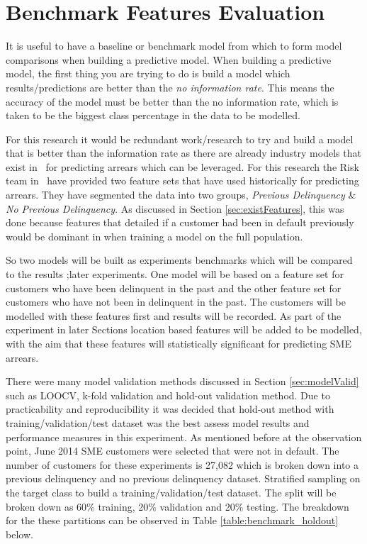 \section{Benchmark Features Evaluation}
It is useful to have a baseline or benchmark model from which to form model comparisons when building a predictive model. When building a predictive model, the first thing you are trying to do is build a model which results/predictions are better than the \textit{no information rate}. This means the accuracy of the model must be better than the no information rate, which is taken to be the biggest class percentage in the data to be modelled. 

For this research it would be redundant work/research to try and build a model that is better than the information rate as there are already industry models that exist in \subjectname\ for predicting arrears which can be leveraged. For this research the Risk team in \subjectname\ have provided two feature sets that have used historically for predicting arrears. They have segmented the data into two groups, \textit{Previous Delinquency} \& \textit{No Previous Delinquency}. As discussed in Section \ref{sec:existFeatures}, this was done because features that detailed if a customer had been in default previously would be dominant in when training a model on the full population.

So two models will be built as experiments benchmarks which will be compared to the results ;later experiments. One model will be based on a feature set for customers who have been delinquent in the past and the other feature set for customers who have not been in delinquent in the past. The customers will be modelled with these features first and results will be recorded. As part of the experiment in later Sections location based features will be added to be modelled, with the aim that these features will statistically significant for predicting SME arrears. 



There were many model validation methods discussed in Section \ref{sec:modelValid} such as LOOCV, k-fold validation and hold-out validation method. Due to practicability and reproducibility it was decided that hold-out method with training/validation/test dataset was the best assess model results and performance measures in this experiment. As mentioned before at the observation point, June 2014 SME customers were selected that were not in default. The number of customers for these experiments is 27,082 which is broken down into a previous delinquency and no previous delinquency dataset. Stratified sampling on the target class to build a training/validation/test dataset. The split will be broken down as 60\% training, 20\% validation and 20\% testing. The breakdown for the these partitions can be observed in Table \ref{table:benchmark_holdout} below. 

